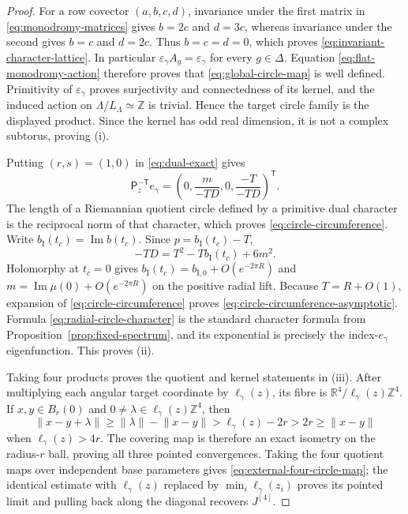 \documentclass[11pt]{article}
\numberwithin{equation}{section}
\theoremstyle{definition}
\theoremstyle{remark}
\newcommand{\R}{\mathbb R}
\newcommand{\Z}{\mathbb Z}
\begin{document}
\begin{proof}
For a row covector $(a,b,c,d)$, invariance under the first matrix in
\eqref{eq:monodromy-matrices} gives $b=2c$ and $d=3c$, whereas invariance
under the second gives $b=c$ and $d=2c$.  Thus $b=c=d=0$, which proves
\eqref{eq:invariant-character-lattice}.  In particular
$\varepsilon_\gamma A_g=\varepsilon_\gamma$ for every $g\in\Delta$.
Equation \eqref{eq:flat-monodromy-action} therefore proves that
\eqref{eq:global-circle-map} is well defined.  Primitivity of
$\varepsilon_\gamma$ proves surjectivity and connectedness of its kernel,
and the induced action on $\Lambda/L_\Lambda\simeq\Z$ is trivial.  Hence the
target circle family is the displayed product.  Since the kernel has odd real
dimension, it is not a complex subtorus, proving (i).

Putting $(r,s)=(1,0)$ in \eqref{eq:dual-exact} gives
\begin{equation}\label{eq:circle-dual-vector}
 \mathsf P_z^{-\mathsf T}e_\gamma
 =\left(0,\frac{m}{-TD},0,\frac{-T}{-TD}\right)^{\mathsf T}.
\end{equation}
The length of a Riemannian quotient circle defined by a primitive dual
character is the reciprocal norm of that character, which proves
\eqref{eq:circle-circumference}.  Write
$b_{\mathrm I}(t_c)=\operatorname{Im}b(t_c)$.  Since
$p=b_{\mathrm I}(t_c)-T$,
\begin{equation}\label{eq:circumference-numerator}
 -TD=T^2-Tb_{\mathrm I}(t_c)+6m^2.
\end{equation}
Holomorphy at $t_c=0$ gives
$b_{\mathrm I}(t_c)=b_{\mathrm I,0}+O(e^{-2\pi R})$ and
$m=\operatorname{Im}\mu(0)+O(e^{-2\pi R})$ on the positive radial lift.
Because $T=R+O(1)$, expansion of
\eqref{eq:circle-circumference} proves
\eqref{eq:circle-circumference-asymptotic}.  Formula
\eqref{eq:radial-circle-character} is the standard character formula from
Proposition~\ref{prop:fixed-spectrum}, and its exponential is precisely the
index-$e_\gamma$ eigenfunction.  This proves (ii).

Taking four products proves the quotient and kernel statements in (iii).
After multiplying each angular target coordinate by $\ell_\gamma(z)$, its
fibre is $\R^4/\ell_\gamma(z)\Z^4$.  If $x,y\in B_r(0)$ and
$0\ne\lambda\in\ell_\gamma(z)\Z^4$, then
\[
 \lVert x-y+\lambda\rVert
 \ge \lVert\lambda\rVert-\lVert x-y\rVert
 >\ell_\gamma(z)-2r>2r\ge\lVert x-y\rVert
\]
when $\ell_\gamma(z)>4r$.  The covering map is therefore an exact isometry
on the radius-$r$ ball, proving all three pointed convergences.  Taking the
four quotient maps over independent base parameters gives
\eqref{eq:external-four-circle-map}; the identical estimate with
$\ell_\gamma(z)$ replaced by $\min_i\ell_\gamma(z_i)$ proves its pointed
limit and pulling back along the diagonal recovers $J^{[4]}$.


\end{proof}
\end{document}
